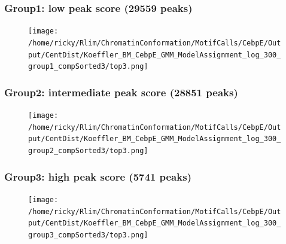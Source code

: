 \documentclass[notes]{beamer}
\begin{document}
\begin{frame}[plain]
    \frametitle{Group1: low peak score (29559 peaks)}
    \begin{figure}
        \texttt{[image: /home/ricky/Rlim/ChromatinConformation/MotifCalls/CebpE/Output/CentDist/Koeffler\_BM\_CebpE\_GMM\_ModelAssignment\_log\_300\_group1\_compSorted3/top3.png]}
    \end{figure}
\end{frame}

\begin{frame}[plain]
    \frametitle{Group2: intermediate peak score (28851 peaks)}
    \begin{figure}
        \texttt{[image: /home/ricky/Rlim/ChromatinConformation/MotifCalls/CebpE/Output/CentDist/Koeffler\_BM\_CebpE\_GMM\_ModelAssignment\_log\_300\_group2\_compSorted3/top3.png]}
    \end{figure}
\end{frame}

\begin{frame}[plain]
    \frametitle{Group3: high peak score (5741 peaks)}
    \begin{figure}
        \texttt{[image: /home/ricky/Rlim/ChromatinConformation/MotifCalls/CebpE/Output/CentDist/Koeffler\_BM\_CebpE\_GMM\_ModelAssignment\_log\_300\_group3\_compSorted3/top3.png]}
    \end{figure}
\end{frame}


\end{document}
